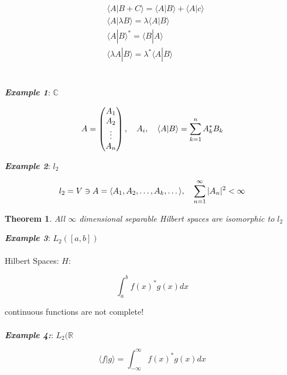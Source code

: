 \documentclass[svgnames]{article}   	%
\newtheorem{theorem}{Theorem}
\begin{document}
\begin{align*}
  &\langle A | B + C \rangle = \langle A | B \rangle + \langle A | c \rangle \\
  &\langle A | \lambda B \rangle = \lambda \langle A | B \rangle \\
  &\langle A | B \rangle^\ast = \langle B | A \rangle \\
  &\langle \lambda A | B \rangle = \lambda^\ast \langle A | B \rangle 
\end{align*}
\mbox{}\\\\
\textit{ \textbf{Example 1}}: $\mathbb{C} $

\[
  A = \begin{pmatrix} A_1 \\ A_2 \\ \vdots \\ A_n \end{pmatrix}, \hspace{10px}
  A_i, \hspace{10px} \langle A | B \rangle = \sum_{k=1}^n A_k^\ast B_k 
\] \vspace{5px}

\noindent \textit{ \textbf{Example 2}}: $l_2$

\begin{align*}
 l_2 = V \ni A = \langle A_1, A_2 , \dots , A_k, \dots \rangle, \hspace{10px}
  \sum_{n=1}^{\infty} |A_n|^2 < \infty
\end{align*}

\begin{theorem}
All $\infty$ dimensional separable Hilbert spaces are isomorphic to $l_2$
\end{theorem} \vspace{20px} 

\noindent \textbf{ \textit{Example 3}}: $L_2 ([a, b])$
\mbox{}\\\\
Hilbert Spaces: $H$:

 \[
\int_a^b f(x)^\ast g(x) dx
\] \vspace{5px}

continuous functions are not complete!
\mbox{}\\\\

\textit{ \textbf{Example 4:}}: $L_2(\mathbb{R}$

\[
  \langle f | g \rangle = \int_{-\infty}^{\infty} f(x)^\ast g(x) dx
\]
\mbox{}\\\\
\end{document}
